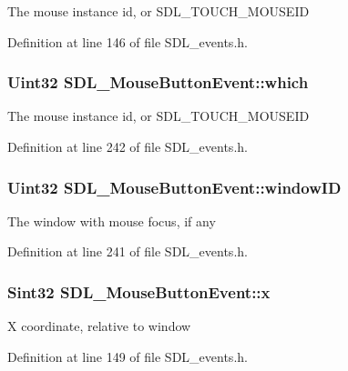 The mouse instance id, or S\+D\+L\+\_\+\+T\+O\+U\+C\+H\+\_\+\+M\+O\+U\+S\+E\+I\+D 

Definition at line 146 of file S\+D\+L\+\_\+events.\+h.

\hypertarget{structSDL__MouseButtonEvent_a366aef59a0f393afc8a3561e741825df}{
\subsubsection[{which}]{\setlength{\rightskip}{0pt plus 5cm}Uint32 S\+D\+L\+\_\+\+Mouse\+Button\+Event\+::which}}\label{structSDL__MouseButtonEvent_a366aef59a0f393afc8a3561e741825df}
The mouse instance id, or S\+D\+L\+\_\+\+T\+O\+U\+C\+H\+\_\+\+M\+O\+U\+S\+E\+I\+D 

Definition at line 242 of file S\+D\+L\+\_\+events.\+h.

\hypertarget{structSDL__MouseButtonEvent_ab3b855d4b543b5d02fcf5d56e4421393}{
\subsubsection[{window\+I\+D}]{\setlength{\rightskip}{0pt plus 5cm}Uint32 S\+D\+L\+\_\+\+Mouse\+Button\+Event\+::window\+I\+D}}\label{structSDL__MouseButtonEvent_ab3b855d4b543b5d02fcf5d56e4421393}
The window with mouse focus, if any 

Definition at line 241 of file S\+D\+L\+\_\+events.\+h.

\hypertarget{structSDL__MouseButtonEvent_a5bb9c61b86e999f58637511e32e3a076}{
\subsubsection[{x}]{\setlength{\rightskip}{0pt plus 5cm}Sint32 S\+D\+L\+\_\+\+Mouse\+Button\+Event\+::x}}\label{structSDL__MouseButtonEvent_a5bb9c61b86e999f58637511e32e3a076}
X coordinate, relative to window 

Definition at line 149 of file S\+D\+L\+\_\+events.\+h.

